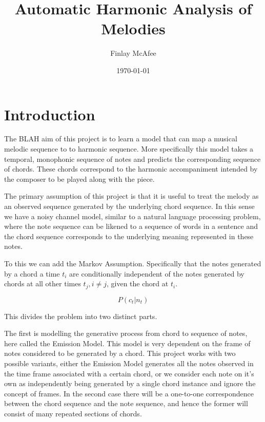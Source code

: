 \documentclass[bsc,frontabs,twoside,singlespacing,parskip,deptreport]{infthesis}
\begin{document}
\title{Automatic Harmonic Analysis of Melodies}

\author{Finlay McAfee}


\date{\today}

\maketitle



\chapter{Introduction}
The BLAH aim of this project is to learn a model that can map a musical melodic sequence to to harmonic sequence. More specifically this model takes a temporal, monophonic sequence of notes and predicts the corresponding sequence of chords. These chords correspond to the harmonic accompaniment intended by the composer to be played along with the piece.

The primary assumption of this project is that it is useful to treat the melody as an observed sequence generated by the underlying chord sequence. In this sense we have a noisy channel model, similar to a natural language processing problem, where the note sequence can be likened to a sequence of words in a sentence and the chord sequence corresponds to the underlying meaning represented in these notes.

To this we can add the Markov Assumption. Specifically that the notes generated by a chord a time $t_i$ are conditionally independent of the notes generated by chords at all other times $t_j, i \neq j$, given the chord at $t_i$.

\begin{equation} \label{eq1}
P(c_t | n_t)
\end{equation}

This divides the problem into two distinct parts.

The first is modelling the generative process from chord to sequence of notes, here called the Emission Model. This model is very dependent on the frame of notes considered to be generated by a chord. This project works with two possible variants, either the Emission Model generates all the notes observed in the time frame associated with a certain chord, or we consider each note on it's own as independently being generated by a single chord instance and ignore the concept of frames. In the second case there will be a one-to-one correspondence between the chord sequence and the note sequence, and hence the former will consist of many repeated sections of chords.
\end{document}
